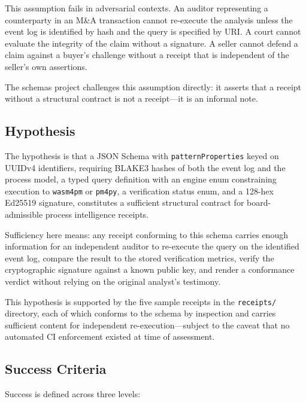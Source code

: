 This assumption fails in adversarial contexts. An auditor representing a counterparty in an
M\&A transaction cannot re-execute the analysis unless the event log is identified by hash and the
query is specified by URI. A court cannot evaluate the integrity of the claim without a signature.
A seller cannot defend a claim against a buyer's challenge without a receipt that is independent
of the seller's own assertions.

The schemas project challenges this assumption directly: it asserts that a receipt without a
structural contract is not a receipt---it is an informal note.

\subsection{Hypothesis}
\label{sec:schemas-research-question-hypothesis}

The hypothesis is that a JSON Schema with \texttt{patternProperties} keyed on UUIDv4 identifiers,
requiring BLAKE3 hashes of both the event log and the process model, a typed query definition with
an engine enum constraining execution to \texttt{wasm4pm} or \texttt{pm4py}, a verification status
enum, and a 128-hex Ed25519 signature, constitutes a sufficient structural contract for
board-admissible process intelligence receipts.

Sufficiency here means: any receipt conforming to this schema carries enough information for an
independent auditor to re-execute the query on the identified event log, compare the result to the
stored verification metrics, verify the cryptographic signature against a known public key, and
render a conformance verdict without relying on the original analyst's testimony.

This hypothesis is supported by the five sample receipts in the \texttt{receipts/} directory, each
of which conforms to the schema by inspection and carries sufficient content for independent
re-execution---subject to the caveat that no automated CI enforcement existed at time of assessment.

\subsection{Success Criteria}
\label{sec:schemas-research-question-success}

Success is defined across three levels:

